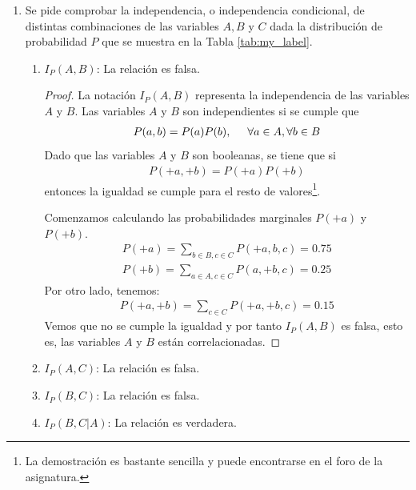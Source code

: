 \documentclass[12pt,a4paper]{article}
\begin{document}
\begin{enumerate}
    \item Se pide comprobar la independencia, o independencia condicional, de distintas combinaciones de  las variables $A, B$ y $C$ dada la distribución de probabilidad $P$ que se muestra en la Tabla \ref{tab:my_label}.
    \begin{enumerate}
        \item $I_P(A, B)$: \; La relación es falsa.
        
        \begin{proof}
            La notación $I_P(A, B)$ representa la independencia de las variables $A$ y $B$. Las variables $A$ y $B$ son independientes si se cumple que
            \begin{align}
                P(a, b) = P(a) P(b), \hspace{0.5cm} \forall a \in A, \forall b \in B
            \end{align}\label{ec:independencia}
            Dado que las variables $A$ y $B$ son booleanas, se tiene que si 
            \begin{align*}
                P(+a, +b) = P(+a)P(+b)
            \end{align*}
            entonces la igualdad se cumple para el resto de valores\footnote{La demostración es bastante sencilla y puede encontrarse en el foro de la asignatura.}.
            
            Comenzamos calculando las probabilidades marginales $P(+a)$ y $P(+b)$.
            \begin{align*}
                P(+a) = \sum_{b \in B, c \in C} P(+a, b, c) = 0.75 \\
                P(+b) = \sum_{a \in A, c \in C} P(a, +b, c) = 0.25
            \end{align*}
            Por otro lado, tenemos:
            \begin{align*}
                P(+a, +b) = \sum_{c \in C} P(+a, +b, c) = 0.15
            \end{align*}
            Vemos que no se cumple la igualdad y por tanto $I_P(A, B)$ es falsa, esto es, las variables $A$ y $B$ están correlacionadas.
        \end{proof}

        \item $I_P(A, C)$: \; La relación es falsa.
        \item $I_P(B, C)$: \; La relación es falsa.
        \item $I_P(B, C | A)$: \; La relación es verdadera.
        

\end{enumerate}
\end{enumerate}
\end{document}
